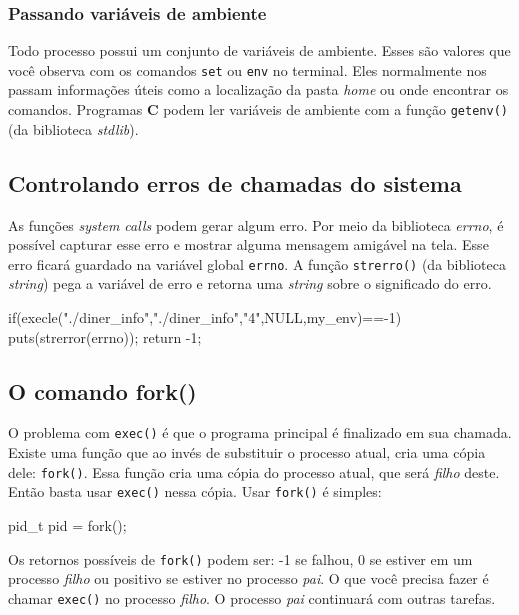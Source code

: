 \documentclass[12pt, a4paper]{article}
\begin{document}
\subsubsection{Passando variáveis de ambiente}

Todo processo possui um conjunto de variáveis de ambiente. Esses são valores que você observa com os comandos \verb|set| ou \verb|env| no terminal. Eles normalmente nos passam informações úteis como a localização da pasta \textit{home} ou onde encontrar os comandos. Programas \textbf{C} podem ler variáveis de ambiente com a função \verb|getenv()| (da biblioteca \textit{stdlib}).

\subsection{Controlando erros de chamadas do sistema}

As funções \textit{system calls} podem gerar algum erro. Por meio da biblioteca \textit{errno}, é possível capturar esse erro e mostrar alguma mensagem amigável na tela. Esse erro ficará guardado na variável global \verb|errno|. A função \verb|strerro()| (da biblioteca \textit{string}) pega a variável de erro e retorna uma \textit{string} sobre o significado do erro.\\

\begin{ccode}
if(execle("./diner_info","./diner_info","4",NULL,my_env)==-1){
    puts(strerror(errno));
    return -1;
}
\end{ccode}

\subsection{O comando fork()}

O problema com \verb|exec()| é que o programa principal é finalizado em sua chamada. Existe uma função que ao invés de substituir o processo atual, cria uma cópia dele: \verb|fork()|. Essa função cria uma cópia do processo atual, que será \textit{filho} deste. Então basta usar \verb|exec()| nessa cópia. Usar \verb|fork()| é simples:\\

\begin{ccode}
pid_t pid = fork();
\end{ccode}

Os retornos possíveis de \verb|fork()| podem ser: -1 se falhou, 0 se estiver em um processo \textit{filho} ou positivo se estiver no processo \textit{pai}. O que você precisa fazer é chamar \verb|exec()| no processo \textit{filho}. O processo \textit{pai} continuará com outras tarefas.
\end{document}
